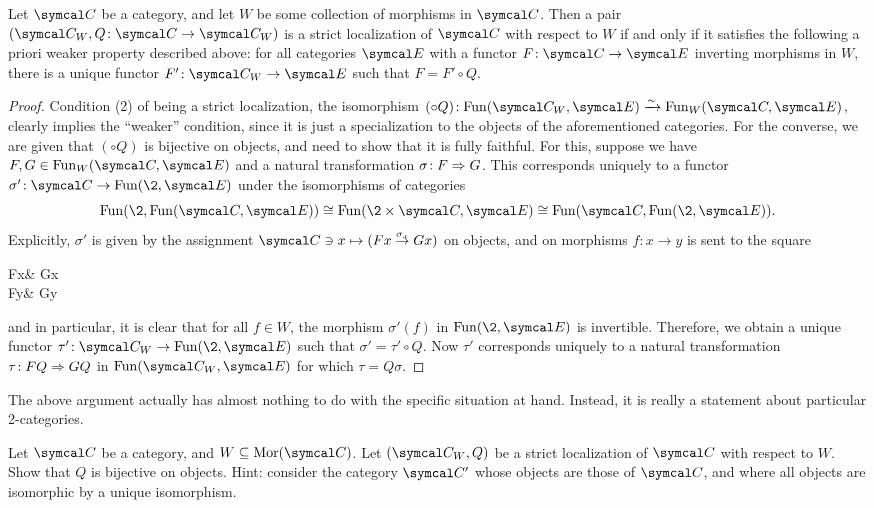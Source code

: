 \begin{lemma}\label{lemma:1-strict-localization-is-2-strict-localization}
	Let \(\calC\) be a category, and let \(W\) be some collection of morphisms in \(\calC\). Then a pair \((\calC_W,Q\!:\calC\to\calC_W)\) is a strict localization of \(\calC\) with respect to \(W\) if and only if
	it satisfies the following a priori weaker property described above: for all categories \(\calE\) with a functor \(F\!:\calC\to\calE\) inverting morphisms in \(W\), there is a unique functor \(F'\!:\calC_W\to\calE\)
	such that \(F = F'\circ Q\).
\end{lemma}
\begin{proof}
Condition (2) of being a strict localization, the isomorphism \((\circ Q)\!:\Fun(\calC_W,\calE)\iso\Fun_W(\calC,\calE)\), clearly implies the ``weaker'' condition, since it is just a specialization
to the objects of the aforementioned categories. For the converse, we are given that \((\circ Q)\) is bijective on objects, and need to show that it is fully faithful. For this, suppose we have
\(F,G\in\Fun_W(\calC,\calE)\) and a natural transformation \(\sigma\!:F\Rightarrow G\). This corresponds uniquely to a functor \(\sigma'\!:\calC\to\Fun(\2,\calE)\) under the isomorphisms of categories
\[ \Fun(\2,\Fun(\calC,\calE)) \cong \Fun(\2\times\calC,\calE)\cong\Fun(\calC,\Fun(\2,\calE)). \]
Explicitly, \(\sigma'\) is given by the assignment \(\calC\ni x \mapsto (Fx\overset{\sigma_x}\to Gx) \) on objects, and on morphisms \(f\!:x\to y\) is sent to the square
\begin{diagram*}
	Fx\ar[r,"\sigma_x"]\ar[d,"F(f)"'] & Gx\ar[d,"G(f)"] \\
	Fy\ar[r,"\sigma_y"] & Gy
\end{diagram*}
and in particular, it is clear that for all \(f\in W\), the morphism \(\sigma'(f)\) in \(\Fun(\2,\calE)\) is invertible. Therefore, we obtain a unique functor \(\tau'\!:\calC_W\to\Fun(\2,\calE)\)
such that \(\sigma' = \tau'\circ Q\). Now \(\tau'\) corresponds uniquely to a natural transformation \(\tau\!:FQ\Rightarrow GQ\) in \(\Fun(\calC_W,\calE)\) for which \(\tau = Q\sigma\).
\phantom{This is just here to get the QED fixed.}
\end{proof}
\begin{remark}
	The above argument actually has almost nothing to do with the specific situation at hand. Instead, it is really a statement about particular 2-categories.
\end{remark}
\begin{exercise}
	Let \(\calC\) be a category, and \(W\subseteq\Mor(\calC)\). Let \((\calC_W,Q)\) be a strict localization of \(\calC\) with respect to \(W\). Show that \(Q\) is bijective on objects. Hint: consider the category
	\(\calC'\) whose objects are those of \(\calC\), and where all objects are isomorphic by a unique isomorphism.
\end{exercise}
